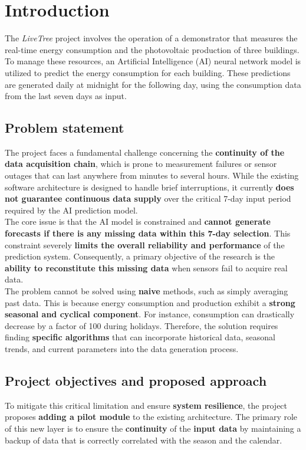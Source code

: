 \section{Introduction}
The \textit{LiveTree} project involves the operation of a demonstrator that measures the real-time energy consumption and the photovoltaic production of three buildings. To manage these resources, an Artificial Intelligence (AI) neural network model is utilized to predict the energy consumption for each building. These predictions are generated daily at midnight for the following day, using the consumption data from the last seven days as input.

\subsection{Problem statement}
The project faces a fundamental challenge concerning the \textbf{continuity of the data acquisition chain}, which is prone to measurement failures or sensor outages that can last anywhere from minutes to several hours. While the existing software architecture is designed to handle brief interruptions, it currently \textbf{does not guarantee continuous data supply} over the critical 7-day input period required by the AI prediction model.\\

The core issue is that the AI model is constrained and \textbf{cannot generate forecasts if there is any missing data within this 7-day selection}. This constraint severely \textbf{limits the overall reliability and performance} of the prediction system. Consequently, a primary objective of the research is the \textbf{ability to reconstitute this missing data} when sensors fail to acquire real data.\\

The problem cannot be solved using \textbf{naive} methods, such as simply averaging past data. This is because energy consumption and production exhibit a \textbf{strong seasonal and cyclical component}. For instance, consumption can drastically decrease by a factor of 100 during holidays. Therefore, the solution requires finding \textbf{specific algorithms} that can incorporate historical data, seasonal trends, and current parameters into the data generation process.

\subsection{Project objectives and proposed approach}
To mitigate this critical limitation and ensure \textbf{system resilience}, the project proposes\textbf{ adding a pilot module} to the existing architecture. The primary role of this new layer is to ensure the \textbf{continuity} of the \textbf{input data} by maintaining a backup of data that is correctly correlated with the season and the calendar.\\

